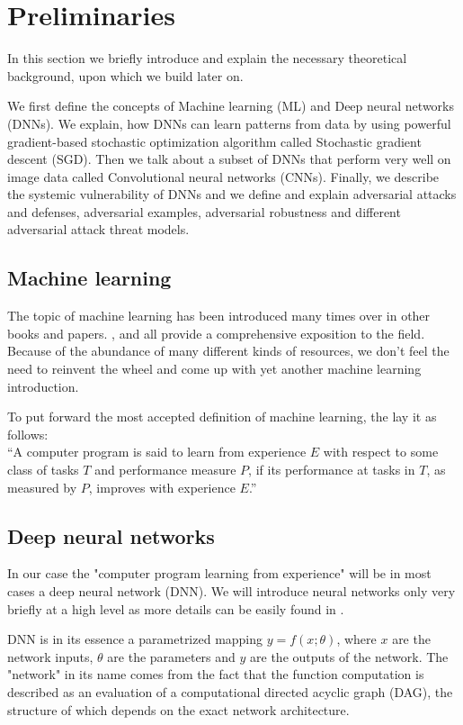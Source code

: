 \chapter{Preliminaries}
\label{preliminaries}

In this section we briefly introduce and explain the necessary theoretical background, upon which we build later on.

We first define the concepts of Machine learning (ML) and Deep neural networks (DNNs). We explain, how DNNs can learn patterns from data by using powerful gradient-based stochastic optimization algorithm called Stochastic gradient descent (SGD). Then we talk about a subset of DNNs that perform very well on image data called Convolutional neural networks (CNNs). Finally, we describe the systemic vulnerability of DNNs and we define and explain adversarial attacks and defenses, adversarial examples, adversarial robustness and different adversarial attack threat models. 


\section{Machine learning}
The topic of machine learning has been introduced many times over in other books and papers. \cite{10.5555/2380985}, \cite{10.5555/1162264} and \cite{Goodfellow-et-al-2016} all provide a comprehensive exposition to the field. Because of the abundance of many different kinds of resources, we don't feel the need to reinvent the wheel and come up with yet another machine learning introduction. 

To put forward the most accepted definition of machine learning, the \cite{10.5555/2380985} lay it as follows: \\

“A computer program is said to learn from experience $E$ with respect to some class of tasks $T$ and performance measure $P$, if its performance at tasks in $T$, as measured by $P$, improves with experience $E$.”

\section{Deep neural networks}
In our case the "computer program learning from experience" will be in most cases a deep neural network (DNN). We will introduce neural networks only very briefly at a high level as more details can be easily found in \cite{Goodfellow-et-al-2016}.

DNN is in its essence a parametrized mapping $y = f(x;\theta)$, where $x$ are the network inputs, $\theta$ are the parameters and $y$ are the outputs of the network. The "network" in its name comes from the fact that the function computation is described as an evaluation of a computational directed acyclic graph (DAG), the structure of which depends on the exact network architecture.

